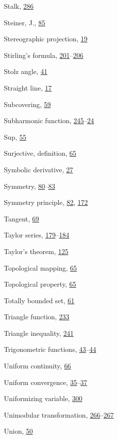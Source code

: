 \begin{theindex}
\item Stalk, \hyperlink{orig-p286}{286}
\item Steiner, J., \hyperlink{orig-p85}{85}
\item Stereographic projection, \hyperlink{orig-p19}{19}
\item Stirling's formula, \hyperlink{orig-p201}{201}--\hyperlink{orig-p206}{206}
\item Stolz angle, \hyperlink{orig-p41}{41}
\item Straight line, \hyperlink{orig-p17}{17}
\item Subcovering, \hyperlink{orig-p59}{59}
\item Subharmonic function, \hyperlink{orig-p245}{245}--\hyperlink{orig-p24}{24}
\item Sup, \hyperlink{orig-p55}{55}
\item Surjective, definition, \hyperlink{orig-p65}{65}
\item Symbolic derivative, \hyperlink{orig-p27}{27}
\item Symmetry, \hyperlink{orig-p80}{80}--\hyperlink{orig-p83}{83}
\item Symmetry principle, \hyperlink{orig-p82}{82}, \hyperlink{orig-p172}{172}
\item Tangent, \hyperlink{orig-p69}{69}
\item Taylor series, \hyperlink{orig-p179}{179}--\hyperlink{orig-p184}{184}
\item Taylor's theorem, \hyperlink{orig-p125}{125}
\item Topological mapping, \hyperlink{orig-p65}{65}
\item Topological property, \hyperlink{orig-p65}{65}
\item Totally bounded set, \hyperlink{orig-p61}{61}
\item Triangle function, \hyperlink{orig-p233}{233}
\item Triangle inequality, \hyperlink{orig-p241}{241}
\item Trigonometric functions, \hyperlink{orig-p43}{43}--\hyperlink{orig-p44}{44}
\item Uniform continuity, \hyperlink{orig-p66}{66}
\item Uniform convergence, \hyperlink{orig-p35}{35}--\hyperlink{orig-p37}{37}
\item Uniformizing variable, \hyperlink{orig-p300}{300}
\item Unimodular transformation, \hyperlink{orig-p266}{266}--\hyperlink{orig-p267}{267}
\item Union, \hyperlink{orig-p50}{50}

\end{theindex}
